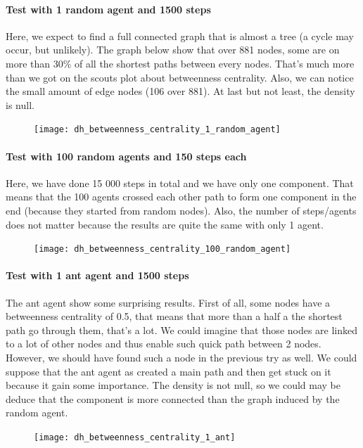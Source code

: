 \documentclass{article}
\begin{document}
		\paragraph{Test with 1 random agent and 1500 steps}
			Here, we expect to find a full connected graph that is almost a tree (a cycle may occur, but unlikely).
			The graph below show that over 881 nodes, some are on more than 30\% of all the shortest paths between every nodes.
			That's much more than we got on the scouts plot about betweenness centrality.
			Also, we can notice the small amount of edge nodes (106 over 881).
			At last but not least, the density is null.
		\begin{figure}[!h]
			\texttt{[image: dh\_betweenness\_centrality\_1\_random\_agent]}
		\end{figure}
		\paragraph{Test with 100 random agents and 150 steps each}
			Here, we have done 15 000 steps in total and we have only one component.
			That means that the 100 agents crossed each other path to form one component in the end
			(because they started from random nodes).
			Also, the number of steps/agents does not matter because the results are quite the same with only 1 agent.
		\begin{figure}[!h]
			\texttt{[image: dh\_betweenness\_centrality\_100\_random\_agent]}
		\end{figure}
		\paragraph{Test with 1 ant agent and 1500 steps}
			The ant agent show some surprising results.
			First of all, some nodes have a betweenness centrality of 0.5,
			that means that more than a half a the shortest path go through them, that's a lot.
			We could imagine that those nodes are linked to a lot of other nodes and thus enable such quick path between 2 nodes.
			However, we should have found such a node in the previous try as well.
			We could suppose that the ant agent as created a main path and then get stuck on it because it gain some importance.
			The density is not null,
			so we could may be deduce that the component is more connected than the graph induced by the random agent.
		\begin{figure}[!h]
			\texttt{[image: dh\_betweenness\_centrality\_1\_ant]}
		\end{figure}
\end{document}
